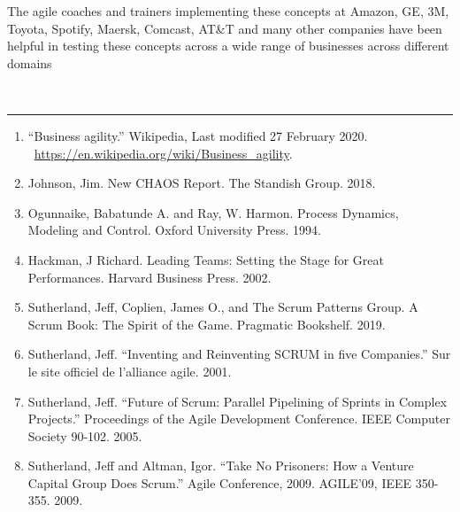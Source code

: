 \documentclass[12pt,a4paper,parskip=full]{scrartcl}
\begin{document}
The agile coaches and trainers implementing these concepts at Amazon, GE, 3M, Toyota, Spotify, Maersk, Comcast, AT\&T and many other companies have been helpful in testing these concepts across a wide range of businesses across different domains

~
\pagebreak
\begin{center}\rule{3in}{0.4pt}\end{center}

\begin{enumerate}
\itemsep1pt\parskip0pt
\item
  ``Business agility.'' Wikipedia, Last modified 27 February
  2020.
  \newline ~\href{https://en.wikipedia.org/wiki/Business_agility}{https://en.wikipedia.org/wiki/Business\_agility}.
\item
  Johnson, Jim. New CHAOS Report. The Standish Group. 2018.
\item
  Ogunnaike, Babatunde A. and Ray, W. Harmon. Process Dynamics, Modeling
  and Control. Oxford University Press. 1994.
\item
  Hackman, J Richard. Leading Teams: Setting the Stage for Great
  Performances. Harvard Business Press. 2002.
\item
  Sutherland, Jeff, Coplien, James O., and The Scrum Patterns Group. A
  Scrum Book: The Spirit of the Game. Pragmatic Bookshelf. 2019.
\item
  Sutherland, Jeff. ``Inventing and Reinventing SCRUM in five
  Companies.'' Sur le site officiel de l'alliance agile. 2001.
\item
  Sutherland, Jeff. ``Future of Scrum: Parallel Pipelining of Sprints in
  Complex Projects.'' Proceedings of the Agile Development Conference.
  IEEE Computer Society 90-102. 2005.
\item
  Sutherland, Jeff and Altman, Igor. ``Take No Prisoners: How a Venture
  Capital Group Does Scrum.'' Agile Conference, 2009. AGILE'09, IEEE
  350-355. 2009.
\end{enumerate}
\end{document}
